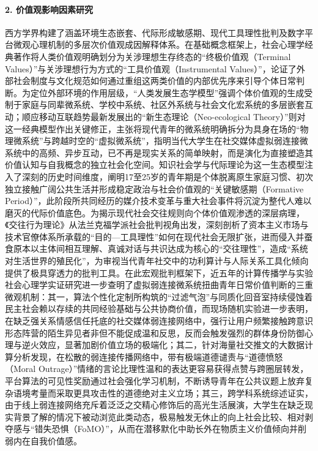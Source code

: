 \paragraph{2. 价值观影响因素研究}
西方学界构建了涵盖环境生态嵌套、代际形成敏感期、现代工具理性批判及数字平台微观心理机制的多层次价值观成因解释体系。在基础概念框架上，社会心理学经典著作将人类价值观明确划分为关涉理想生存终态的“终极价值观（Terminal Values）”与关涉理想行为方式的“工具价值观（Instrumental Values）”，论证了外部社会制度与文化规范如何通过重组这两类价值的内部优先序来引导个体日常判断\cite{Rokeach1973}。为定位外部环境的作用层级，“人类发展生态学模型”强调个体价值观的生成受制于家庭与同辈微系统、学校中系统、社区外系统与社会文化宏系统的多层嵌套互动\cite{Bronfenbrenner1979}；顺应移动互联趋势最新发展出的“新生态理论（Neo-ecological Theory）”则对这一经典模型作出关键修正，主张将现代青年的微系统明确拆分为具身在场的“物理微系统”与跨越时空的“虚拟微系统”，指明当代大学生在社交媒体虚拟弱连接微系统中的高频、异步互动，已不再是现实关系的简单映射，而是演化为直接塑造其价值认知与自我概念的独立社会化空间\cite{Navarro2023}。知识社会学与代际理论为这一生态模型注入了深刻的历史时间维度，阐明17至25岁的青年期是个体脱离原生家庭习惯、初次独立接触广阔公共生活并形成稳定政治与社会价值观的“关键敏感期（Formative Period）”，此阶段所共同经历的媒介技术变革与重大社会事件将沉淀为整代人难以磨灭的代际价值底色\cite{Mannheim1952}。为揭示现代社会交往规则向个体价值观渗透的深层病理，《交往行为理论》从法兰克福学派社会批判视角出发，深刻剖析了资本主义市场与技术官僚体系所承载的“目的—工具理性”如何在现代社会无限扩张，进而侵入并蚕食原本以主体间相互理解、真诚对话与共识达成为核心的“交往理性”，造成“系统对生活世界的殖民化”，为审视当代青年社交中的功利算计与人际关系工具化倾向提供了极具穿透力的批判工具\cite{Habermas2004}。在此宏观批判框架下，近五年的计算传播学与实验社会心理学实证研究进一步查明了虚拟弱连接微系统扭曲青年日常价值判断的三重微观机制：其一，算法个性化定制所构筑的“过滤气泡”与同质化回音室持续侵蚀着民主社会赖以存续的共同经验基础与公共协商价值\cite{Sunstein2017}，而现场随机实验进一步表明，在缺乏强关系情感信任托底的社交媒体弱连接网络中，强行让用户频繁接触跨意识形态阵营的陌生异见者非但不能促成温和反思，反而会触发强烈的群体身份防御心理与逆火效应，显著加剧价值立场的极端化\cite{Bail2018}；其二，针对海量社交推文的大数据计算分析发现，在松散的弱连接传播网络中，带有极端道德谴责与“道德愤怒（Moral Outrage）”情绪的言论比理性温和的表达更容易获得点赞与跨圈层转发，平台算法的可见性奖励通过社会强化学习机制，不断诱导青年在公共议题上放弃复杂语境考量而采取更具攻击性的道德绝对主义立场\cite{Brady2021}；其三，跨学科系统综述证实，由于线上弱连接网络充斥着泛泛之交精心修饰后的高光生活展演，大学生在缺乏现实背景了解的情况下被动浏览此类动态，极易触发无休止的向上社会比较、相对剥夺感与“错失恐惧（FoMO）”，从而在潜移默化中助长外在物质主义价值倾向并削弱内在自我价值感\cite{Verduyn2020}。

